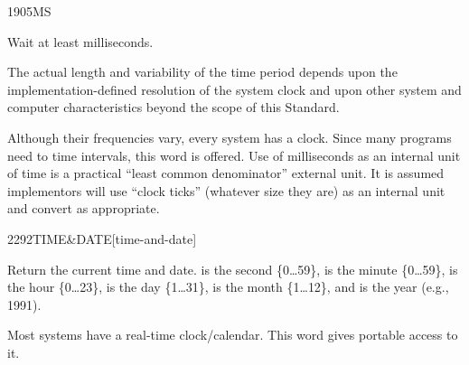 \begin{worddef}{1905}{MS}
\item {}

	Wait at least  milliseconds.

\note
	The actual length and variability of the time period depends
	upon the implementation-defined resolution of the system clock
	and upon other system and computer characteristics beyond the
	scope of this Standard.

	\begin{defer}
	\rationale %
		Although their frequencies vary, every system has a clock.
		Since many programs need to time intervals, this word is
		offered. Use of milliseconds as an internal unit of time is
		a practical ``least common denominator'' external unit. It
		is assumed implementors will use ``clock ticks'' (whatever
		size they are) as an internal unit and convert as appropriate.
	\end{defer}
\end{worddef}


\begin{worddef}[TIMEandDATE]{2292}{TIME\&DATE}[time-and-date]
\item {}

	Return the current time and date.
	 is the second \{0{\ldots}59\},
	 is the minute \{0{\ldots}59\},
	 is the hour \{0{\ldots}23\},
	 is the day \{1{\ldots}31\},
	 is the month \{1{\ldots}12\}, and
	 is the year (e.g., 1991).

	\begin{defer}
	\rationale %
		Most systems have a real-time clock/calendar.
		This word gives portable access to it.
	\end{defer}
\end{worddef}
